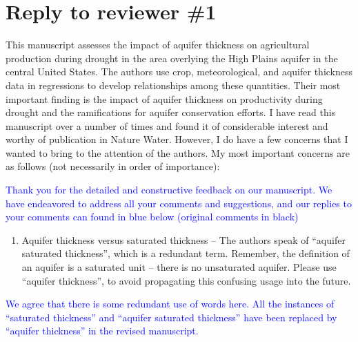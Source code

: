 \documentclass[
]{article}
\author{}
\date{\vspace{-2.5em}}
\providecommand{\tightlist}{%
  \setlength{\itemsep}{0pt}\setlength{\parskip}{0pt}}
\begin{document}
\section{Reply to reviewer \#1}

This manuscript assesses the impact of aquifer thickness on agricultural
production during drought in the area overlying the High Plains aquifer
in the central United States. The authors use crop, meteorological, and
aquifer thickness data in regressions to develop relationships among
these quantities. Their most important finding is the impact of aquifer
thickness on productivity during drought and the ramifications for
aquifer conservation efforts. I have read this manuscript over a number
of times and found it of considerable interest and worthy of publication
in Nature Water. However, I do have a few concerns that I wanted to
bring to the attention of the authors. My most important concerns are as
follows (not necessarily in order of importance):

\textcolor{blue}{Thank you for the detailed and constructive feedback on our manuscript. We have endeavored to address all your comments and suggestions, and our replies to your comments can found in blue below (original comments in black)}

\begin{enumerate}
\def\labelenumi{\arabic{enumi}.}
\tightlist
\item
  Aquifer thickness versus saturated thickness -- The authors speak of
  ``aquifer saturated thickness'', which is a redundant term. Remember, the definition of an aquifer is a saturated unit – there is no unsaturated aquifer. Please use ``aquifer
  thickness'', to avoid propagating this confusing usage into the
  future.
\end{enumerate}

\textcolor{blue}{We agree that there is some redundant use of words here. All the instances of ``saturated thickness'' and ``aquifer saturated thickness'' have been replaced by ``aquifer thickness'' in the revised manuscript.}
\end{document}
